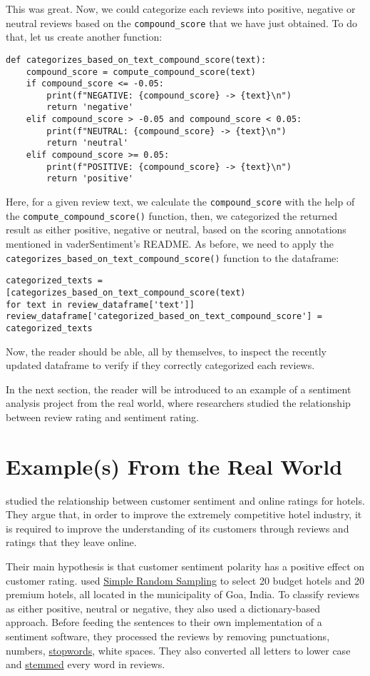 	This was great. Now, we could categorize each reviews into positive, negative or neutral reviews based on the \verb|compound_score| that we have just obtained. To do that, let us create another function:
	\begin{Verbatim}
def categorizes_based_on_text_compound_score(text):
	compound_score = compute_compound_score(text)
	if compound_score <= -0.05:
		print(f"NEGATIVE: {compound_score} -> {text}\n")
		return 'negative'
	elif compound_score > -0.05 and compound_score < 0.05:
		print(f"NEUTRAL: {compound_score} -> {text}\n")
		return 'neutral'
	elif compound_score >= 0.05:
		print(f"POSITIVE: {compound_score} -> {text}\n")
		return 'positive'
	\end{Verbatim}
	Here, for a given review text, we calculate the \verb|compound_score| with the help of the \verb|compute_compound_score()| function, then, we categorized the returned result as either positive, negative or neutral, based on the scoring annotations mentioned in vaderSentiment's README. As before, we need to apply the \verb|categorizes_based_on_text_compound_score()| function to the dataframe:
	\begin{Verbatim}
categorized_texts =
[categorizes_based_on_text_compound_score(text) 
for text in review_dataframe['text']]
review_dataframe['categorized_based_on_text_compound_score'] = 
categorized_texts
	\end{Verbatim}
	Now, the reader should be able, all by themselves, to inspect the recently updated dataframe to verify if they correctly categorized each reviews.
	
	In the next section, the reader will be introduced to an example of a sentiment analysis project from the real world, where researchers studied the relationship between review rating and sentiment rating.
	
	\section{Example(s) From the Real World}\label{sec:examplerealworld}
	\cite{geetha_relationship_2017} studied the relationship between customer sentiment and online ratings for hotels. They argue that, in order to improve the extremely competitive hotel industry, it is required to improve the understanding of its customers through reviews and ratings that they leave online.
	
	Their main hypothesis is that customer sentiment polarity has a positive effect on customer rating. \cite{geetha_relationship_2017} used \href{https://en.wikipedia.org/wiki/Simple_random_sample}{Simple Random Sampling} to select 20 budget hotels and 20 premium hotels, all located in the municipality of Goa, India. To classify reviews as either positive, neutral or negative, they also used a dictionary-based approach. Before feeding the sentences to their own implementation of a sentiment software, they processed the reviews by removing punctuations, numbers, \href{https://en.wikipedia.org/wiki/Stop_words}{stopwords}, white spaces. They also converted all letters to lower case and \href{https://en.wikipedia.org/wiki/Stemming}{stemmed} every word in reviews.
		
